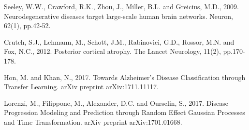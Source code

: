 \documentclass{llncs}
\begin{document}
\begin{thebibliography}{5}
Seeley, W.W., Crawford, R.K., Zhou, J., Miller, B.L. and Greicius, M.D., 2009. Neurodegenerative diseases target large-scale human brain networks. Neuron, 62(1), pp.42-52.

Crutch, S.J., Lehmann, M., Schott, J.M., Rabinovici, G.D., Rossor, M.N. and Fox, N.C., 2012. Posterior cortical atrophy. The Lancet Neurology, 11(2), pp.170-178.

Hon, M. and Khan, N., 2017. Towards Alzheimer's Disease Classification through Transfer Learning. arXiv preprint arXiv:1711.11117.

Lorenzi, M., Filippone, M., Alexander, D.C. and Ourselin, S., 2017. Disease Progression Modeling and Prediction through Random Effect Gaussian Processes and Time Transformation. arXiv preprint arXiv:1701.01668.

\end{thebibliography}

\clearpage
\end{document}
